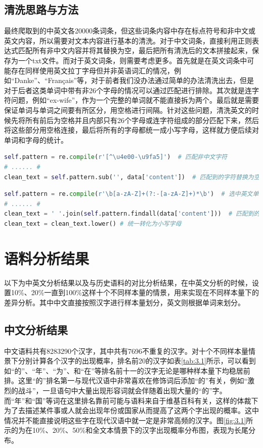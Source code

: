 \documentclass[11pt]{article}
\begin{document}
	\subsection{清洗思路与方法}
	最终爬取到的中英文各20000条词条，但这些词条内容中存在标点符号和非中文或英文内容，所以需要对文本内容进行基本的清洗。对于中文词条，直接利用正则表达式匹配所有非中文内容并将其替换为空，最后把所有清洗后的文本拼接起来，保存为一个txt文件。而对于英文词条，则需要考虑更多。首先就是在英文词条中可能存在同样使用英文拉丁字母但并非英语词汇的情况，例如“Danke”、“Français”等，对于前者我们没办法通过简单的办法清洗出去，但是对于后者这类单词中带有非26个字母的情况可以通过匹配进行排除。其次就是连字符问题，例如“ex-wife”，作为一个完整的单词就不能直接拆为两个。最后就是需要保证单词与单词之间要有所区分，用空格进行间隔。针对这些问题，清洗英文的时候先将所有前后为空格并且内部只有26个字母或连字符组成的部分匹配下来，然后将这些部分用空格连接，最后将所有的字母都统一成小写字母，这样就方便后续对单词和字母的统计。
	\begin{lstlisting}[language=Python, label=code2.4]
self.pattern = re.compile(r'[^\u4e00-\u9fa5]')	# 匹配非中文字符
# ...... #
clean_text = self.pattern.sub('', data['content'])  # 匹配到的字符替换为空
	\end{lstlisting}
	\begin{lstlisting}[language=Python, label=code2.5]
self.pattern = re.compile(r'\b[a-zA-Z]+(?:-[a-zA-Z]+)*\b')	# 选中英文单词（包括连字符）
# ...... #
clean_text = ' '.join(self.pattern.findall(data['content']))  # 匹配到的单词用空格连接起来
clean_text = clean_text.lower()	# 统一转化为小写字母
	\end{lstlisting}
	
	\section{语料分析结果}
	以下为中英文分析结果以及与历史语料的对比分析结果，在中英文分析的时候，设置10\%、20\%一直到100\%这样十个不同样本量的情景，用来实现在不同样本量下的差异分析。其中中文直接按照汉字进行样本量划分，英文则根据单词来划分。
	
	\subsection{中文分析结果}
	中文语料共有8283290个汉字，其中共有7696不重复的汉字。对十个不同样本量情景下分别计算各个汉字的出现概率，排名前20的汉字如表\ref{tab:3.1}所示，可以看到如“的”、“年”、“为”、和“在”等排名前十一的汉字无论是哪种样本量下均稳居前排。这里“的”排名第一与现代汉语中非常喜欢在修饰词后添加“的”有关，例如“激烈的战斗”，一旦语句中大量出现形容词就会伴随着出现大量的“的”字。而“年”和“国”等词在这里排名靠前可能与语料来自于维基百科有关，这样的体裁下为了去描述某件事或人就会出现年份或国家从而提高了这两个字出现的概率。这中情况并不能直接说明这些字在现代汉语中就一定是非常高频的汉字。图\ref{fig:3.1}所示的为在10\%、20\%、50\%和全文本情景下的汉字出现概率分布图，表现为长尾分布。
	
\end{document}

